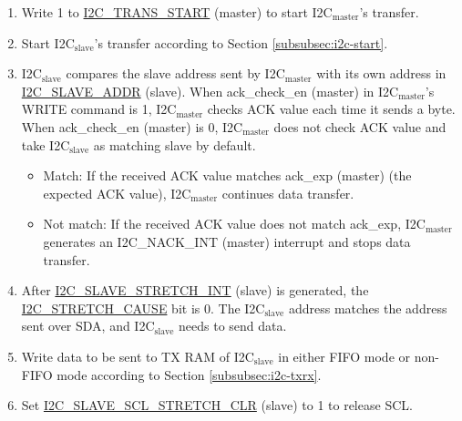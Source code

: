 \documentclass[main\_\_EN.tex]{subfiles}
\begin{document}
\begin{enumerate}
\item Write 1 to \hyperref[fielddesc:I2CTRANSSTART]{I2C\_TRANS\_START} (master) to start I2C$_\text{master}$'s transfer.
\item Start I2C$_\text{slave}$'s transfer according to Section \ref{subsubsec:i2c-start}.
\item I2C$_\text{slave}$ compares the slave address sent by I2C$_\text{master}$ with its own address in \hyperref[fielddesc:I2CSLAVEADDR]{I2C\_SLAVE\_ADDR} (slave). When ack\_check\_en (master) in I2C$_\text{master}$'s WRITE command is 1, I2C$_\text{master}$ checks ACK value each time it sends a byte. When ack\_check\_en (master) is 0, I2C$_\text{master}$ does not check ACK value and take I2C$_\text{slave}$ as matching slave by default.
\begin{itemize}
\item Match: If the received ACK value matches ack\_exp (master) (the expected ACK value), I2C$_\text{master}$ continues data transfer.
\item Not match: If the received ACK value does not match ack\_exp, I2C$_\text{master}$ generates an I2C\_NACK\_INT (master) interrupt and stops data transfer.
\end{itemize}

\item After \hyperref[int:i2c-slave-stretch]{I2C\_SLAVE\_STRETCH\_INT} (slave) is generated, the \hyperref[fielddesc:I2CSTRETCHCAUSE]{I2C\_STRETCH\_CAUSE} bit is 0. The I2C$_\text{slave}$ address matches the address sent over SDA, and I2C$_\text{slave}$ needs to send data.

\item Write data to be sent to TX RAM of I2C$_\text{slave}$ in either FIFO mode or non-FIFO mode according to Section \ref{subsubsec:i2c-txrx}.
\item Set \hyperref[fielddesc:I2CSLAVESCLSTRETCHCLR]{I2C\_SLAVE\_SCL\_STRETCH\_CLR} (slave) to 1 to release SCL.



\end{enumerate}
\end{document}
